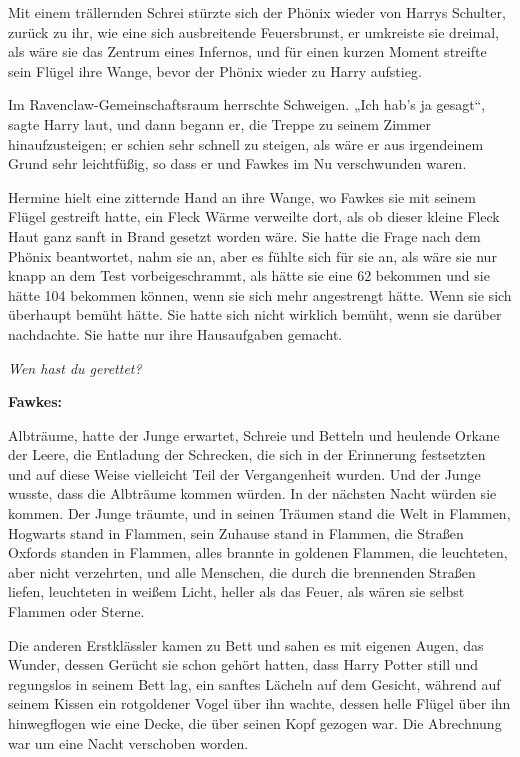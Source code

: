 {Mit einem trällernden Schrei stürzte sich der Phönix wieder von Harrys Schulter, zurück zu ihr, wie eine sich ausbreitende Feuersbrunst, er umkreiste sie dreimal, als wäre sie das Zentrum eines Infernos, und für einen kurzen Moment streifte sein Flügel ihre Wange, bevor der Phönix wieder zu Harry aufstieg.

Im Ravenclaw-Gemeinschaftsraum herrschte Schweigen. „Ich hab's ja gesagt“, sagte Harry laut, und dann begann er, die Treppe zu seinem Zimmer hinaufzusteigen; er schien sehr schnell zu steigen, als wäre er aus irgendeinem Grund sehr leichtfüßig, so dass er und Fawkes im Nu verschwunden waren.

Hermine hielt eine zitternde Hand an ihre Wange, wo Fawkes sie mit seinem Flügel gestreift hatte, ein Fleck Wärme verweilte dort, als ob dieser kleine Fleck Haut ganz sanft in Brand gesetzt worden wäre. Sie hatte die Frage nach dem Phönix beantwortet, nahm sie an, aber es fühlte sich für sie an, als wäre sie nur knapp an dem Test vorbeigeschrammt, als hätte sie eine 62 bekommen und sie hätte 104 bekommen können, wenn sie sich mehr angestrengt hätte. Wenn sie sich überhaupt bemüht hätte. Sie hatte sich nicht wirklich bemüht, wenn sie darüber nachdachte. Sie hatte nur ihre Hausaufgaben gemacht.

\emph{Wen hast du gerettet?}

\textbf{Fawkes:}

Albträume, hatte der Junge erwartet, Schreie und Betteln und heulende Orkane der Leere, die Entladung der Schrecken, die sich in der Erinnerung festsetzten und auf diese Weise vielleicht Teil der Vergangenheit wurden. Und der Junge wusste, dass die Albträume kommen würden. In der nächsten Nacht würden sie kommen. Der Junge träumte, und in seinen Träumen stand die Welt in Flammen, Hogwarts stand in Flammen, sein Zuhause stand in Flammen, die Straßen Oxfords standen in Flammen, alles brannte in goldenen Flammen, die leuchteten, aber nicht verzehrten, und alle Menschen, die durch die brennenden Straßen liefen, leuchteten in weißem Licht, heller als das Feuer, als wären sie selbst Flammen oder Sterne.

Die anderen Erstklässler kamen zu Bett und sahen es mit eigenen Augen, das Wunder, dessen Gerücht sie schon gehört hatten, dass Harry Potter still und regungslos in seinem Bett lag, ein sanftes Lächeln auf dem Gesicht, während auf seinem Kissen ein rotgoldener Vogel über ihn wachte, dessen helle Flügel über ihn hinwegflogen wie eine Decke, die über seinen Kopf gezogen war. Die Abrechnung war um eine Nacht verschoben worden.

}
